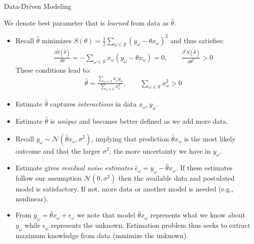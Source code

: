 \documentclass[9pt]{beamer}
\begin{document}
%
\begin{frame}{Data-Driven Modeling}

We denote best parameter that is {\em learned} from data as $\hat{\theta}$. 
\begin{itemize}
\item Recall $\hat{\theta}$ minimizes $S(\theta)=\frac{1}{2}\sum_{\omega \in \mathcal{S}} (y_\omega-\theta x_\omega)^2$ and thus satisfies:
\begin{align*}
\frac{\partial S(\hat{\theta})}{\partial \theta}=-\sum_{\omega \in \mathcal{S}}x_\omega (y_\omega-\theta x_\omega)=0,\qquad  \frac{\partial^2 S(\hat{\theta})}{\partial \theta^2}>0
\end{align*}
These conditions lead to:
\begin{align*}
\hat{\theta}=\frac{\sum_{\omega \in \mathcal{S}}x_\omega y_\omega}{\sum_{\omega \in \mathcal{S}}x_\omega^2},\qquad \sum_{\omega \in \mathcal{S}}x_\omega^2>0 
\end{align*}
\item Estimate $\hat{\theta}$ captures {\em interactions} in data $x_\omega,y_\omega$. 
\item Estimate $\hat{\theta}$ is {\em unique} and becomes better defined as we add more data. 
\item Recall $y_\omega \sim \mathcal{N}(\hat{\theta} x_\omega,\sigma^2)$, implying that prediction $\hat{\theta} x_\omega$ is the most likely outcome and that the larger $\sigma^2$, the more uncertainty we have in $y_\omega$. 
\item Estimate gives {\em residual noise estimates} $\hat{\epsilon}_\omega =y_\omega-\hat{\theta}x_\omega$. If these estimates follow our assumption $\mathcal{N}(0,\sigma^2)$ then the available data and postulated model is satisfactory. If not, more data or another model is needed (e.g., nonlinear). 

\item From $y_\omega=\hat{\theta}x_\omega+\epsilon_\omega$ we note that model $\hat{\theta}x_\omega$ represents what we know about $y_\omega$ while $\epsilon_\omega$ represents the unknown. Estimation problem thus seeks to extract maximum knowledge from data (minimize the unknown). 
\end{itemize}
\end{frame}
\end{document}
